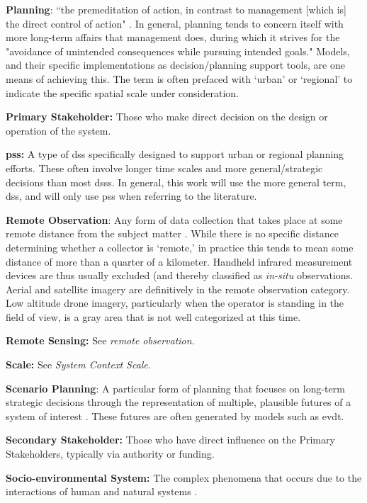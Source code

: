 \textbf{Planning}: ``the premeditation of action, in contrast to management [which is] the direct control of action" \cite{harrisLocationalModelsGeographic1993}. In general, planning tends to concern itself with more long-term affairs that management does, during which it strives for the "avoidance of unintended consequences while pursuing intended goals." Models, and their specific implementations as decision/planning support tools, are one means of achieving this. The term is often prefaced with `urban' or `regional' to indicate the specific spatial scale under consideration.

\textbf{Primary Stakeholder:} Those who make direct decision on the design or operation of the system.

\textbf{\acf{pss}:} A type of \ac{dss} specifically designed to support urban or regional planning efforts. These often involve longer time scales and more general/strategic decisions than most \acp{dss}. In general, this work will use the more general term, \ac{dss}, and will only use \ac{pss} when referring to the literature.

\textbf{Remote Observation}: Any form of data collection that takes place at some remote distance from the subject matter \cite{jensenRemoteSensingEnvironment2006}. While there is no specific distance determining whether a collector is `remote,' in practice this tends to mean some distance of more than a quarter of a kilometer. Handheld infrared measurement devices are thus usually excluded (and thereby classified as \textit{in-situ} observations. Aerial and satellite imagery are definitively in the remote observation category. Low altitude drone imagery, particularly when the operator is standing in the field of view, is a gray area that is not well categorized at this time.

\textbf{Remote Sensing:} See \textit{remote observation}.

\textbf{Scale:} See \textit{System Context Scale}.

\textbf{Scenario Planning}: A particular form of planning that focuses on long-term strategic decisions through the representation of multiple, plausible futures of a system of interest \cite{goodspeedScenarioPlanningCities2020}. These futures are often generated by models such as \ac{evdt}.

\textbf{Secondary Stakeholder:} Those who have direct influence on the Primary Stakeholders, typically via authority or funding.

\textbf{Socio-environmental System:} The complex phenomena that occurs due to the interactions of human and natural systems \cite{elsawahEightGrandChallenges2020}.

